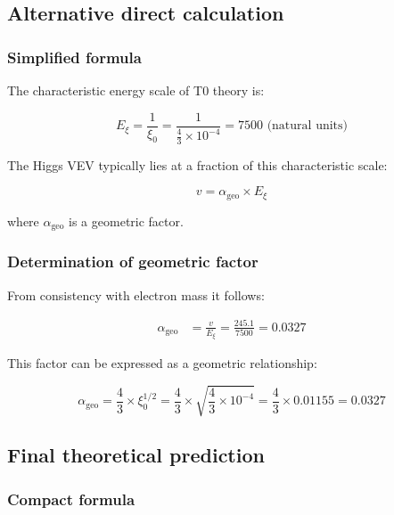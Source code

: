 \documentclass[12pt,a4paper]{article}
\begin{document}
\subsection{Alternative direct calculation}

\subsubsection{Simplified formula}

The characteristic energy scale of T0 theory is:

\begin{equation}
	E_\xi = \frac{1}{\xi_0} = \frac{1}{\frac{4}{3} \times 10^{-4}} = 7500 \text{ (natural units)}
\end{equation}

The Higgs VEV typically lies at a fraction of this characteristic scale:

\begin{equation}
	v = \alpha_{\text{geo}} \times E_\xi
\end{equation}

where $\alpha_{\text{geo}}$ is a geometric factor.

\subsubsection{Determination of geometric factor}

From consistency with electron mass it follows:

\begin{align}
	\alpha_{\text{geo}} &= \frac{v}{E_\xi} = \frac{245.1}{7500} = 0.0327
\end{align}

This factor can be expressed as a geometric relationship:

\begin{equation}
	\alpha_{\text{geo}} = \frac{4}{3} \times \xi_0^{1/2} = \frac{4}{3} \times \sqrt{\frac{4}{3} \times 10^{-4}} = \frac{4}{3} \times 0.01155 = 0.0327
\end{equation}

\subsection{Final theoretical prediction}

\subsubsection{Compact formula}
\end{document}
